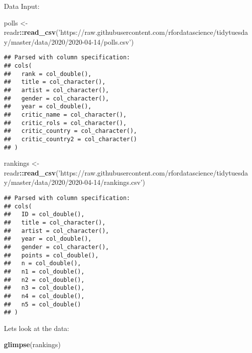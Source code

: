 \documentclass[
]{article}
\newenvironment{Shaded}{\begin{snugshade}}{\end{snugshade}}
\newcommand{\KeywordTok}[1]{\textcolor[rgb]{0.13,0.29,0.53}{\textbf{#1}}}
\newcommand{\NormalTok}[1]{#1}
\newcommand{\OperatorTok}[1]{\textcolor[rgb]{0.81,0.36,0.00}{\textbf{#1}}}
\newcommand{\StringTok}[1]{\textcolor[rgb]{0.31,0.60,0.02}{#1}}
\begin{document}
Data Input:

\begin{Shaded}
\begin{Highlighting}[]
\NormalTok{polls <-}\StringTok{ }\NormalTok{readr}\OperatorTok{::}\KeywordTok{read_csv}\NormalTok{(}\StringTok{'https://raw.githubusercontent.com/rfordatascience/tidytuesday/master/data/2020/2020-04-14/polls.csv'}\NormalTok{)}
\end{Highlighting}
\end{Shaded}

\begin{verbatim}
## Parsed with column specification:
## cols(
##   rank = col_double(),
##   title = col_character(),
##   artist = col_character(),
##   gender = col_character(),
##   year = col_double(),
##   critic_name = col_character(),
##   critic_rols = col_character(),
##   critic_country = col_character(),
##   critic_country2 = col_character()
## )
\end{verbatim}

\begin{Shaded}
\begin{Highlighting}[]
\NormalTok{rankings <-}\StringTok{ }\NormalTok{readr}\OperatorTok{::}\KeywordTok{read_csv}\NormalTok{(}\StringTok{'https://raw.githubusercontent.com/rfordatascience/tidytuesday/master/data/2020/2020-04-14/rankings.csv'}\NormalTok{)}
\end{Highlighting}
\end{Shaded}

\begin{verbatim}
## Parsed with column specification:
## cols(
##   ID = col_double(),
##   title = col_character(),
##   artist = col_character(),
##   year = col_double(),
##   gender = col_character(),
##   points = col_double(),
##   n = col_double(),
##   n1 = col_double(),
##   n2 = col_double(),
##   n3 = col_double(),
##   n4 = col_double(),
##   n5 = col_double()
## )
\end{verbatim}

Lets look at the data:

\begin{Shaded}
\begin{Highlighting}[]
\KeywordTok{glimpse}\NormalTok{(rankings)}
\end{Highlighting}
\end{Shaded}
\end{document}
